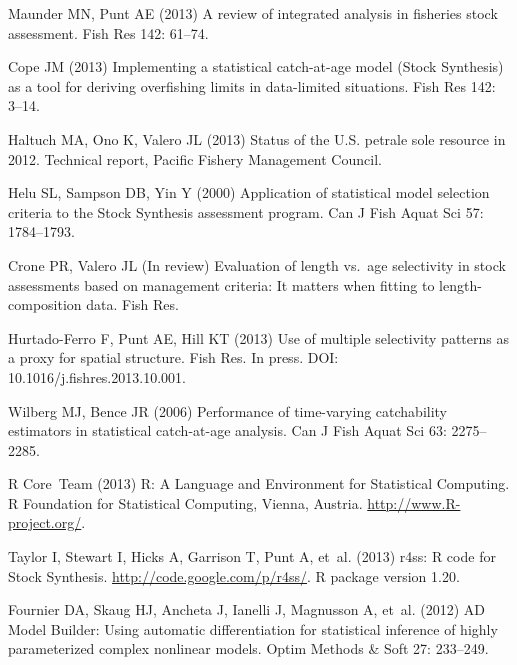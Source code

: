 \documentclass[10pt]{article}
\begin{document}
\begin{thebibliography}{10}
Maunder MN, Punt AE (2013) A review of integrated analysis in fisheries stock
  assessment.
\newblock Fish Res 142: 61--74.

Cope JM (2013) Implementing a statistical catch-at-age model ({Stock
  Synthesis}) as a tool for deriving overfishing limits in data-limited
  situations.
\newblock Fish Res 142: 3--14.

Haltuch MA, Ono K, Valero JL (2013) Status of the {U.S.} petrale sole resource
  in 2012.
\newblock Technical report, Pacific Fishery Management Council.

Helu SL, Sampson DB, Yin Y (2000) Application of statistical model selection
  criteria to the {Stock Synthesis} assessment program.
\newblock Can J Fish Aquat Sci 57: 1784--1793.

Crone PR, Valero JL (In review) Evaluation of length vs.~age selectivity in
  stock assessments based on management criteria: It matters when fitting to
  length-composition data.
\newblock Fish Res.

Hurtado-Ferro F, Punt AE, Hill KT (2013) Use of multiple selectivity patterns
  as a proxy for spatial structure.
\newblock Fish Res. In press. DOI: 10.1016/j.fishres.2013.10.001.

Wilberg MJ, Bence JR (2006) Performance of time-varying catchability estimators
  in statistical catch-at-age analysis.
\newblock Can J Fish Aquat Sci 63: 2275--2285.

R Core~Team (2013) R: A Language and Environment for
  Statistical Computing.
\newblock R Foundation for Statistical Computing, Vienna, Austria.
\newblock \urlprefix\url{http://www.R-project.org/}.

Taylor I, Stewart I, Hicks A, Garrison T, Punt A, et~al. (2013) r4ss:
  R code for Stock Synthesis.
\newblock \urlprefix\url{http://code.google.com/p/r4ss/}.
\newblock R package version 1.20.

Fournier DA, Skaug HJ, Ancheta J, Ianelli J, Magnusson A, et~al. (2012) {AD
  Model Builder}: Using automatic differentiation for statistical inference of
  highly parameterized complex nonlinear models.
\newblock Optim Methods \& Soft 27: 233--249.


\end{thebibliography}
\end{document}
